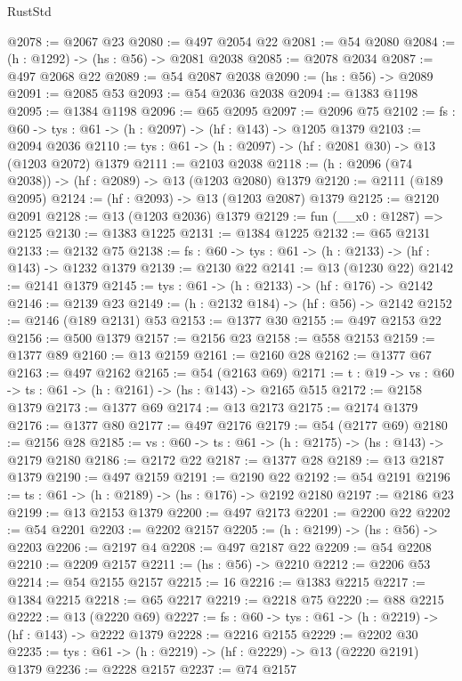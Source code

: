 \begin{lexlean}{RustStd}
\begin{coremodule}
{\begin{coremodule}
{{{{{{{{{{{{@2078 := @2067 @23
@2080 := @497 @2054 @22
@2081 := @54 @2080
@2084 := (h : @1292) -> (hs : @56) -> @2081 @2038
@2085 := @2078 @2034
@2087 := @497 @2068 @22
@2089 := @54 @2087 @2038
@2090 := (hs : @56) -> @2089
@2091 := @2085 @53
@2093 := @54 @2036 @2038
@2094 := @1383 @1198
@2095 := @1384 @1198
@2096 := @65 @2095
@2097 := @2096 @75
@2102 := {fs : @60} -> {tys : @61} -> (h : @2097) -> (hf : @143) -> @1205 @1379
@2103 := @2094 @2036
@2110 := {tys : @61} -> (h : @2097) -> (hf : @2081 @30) -> @13 (@1203 @2072) @1379
@2111 := @2103 @2038
@2118 := (h : @2096 (@74 @2038)) -> (hf : @2089) -> @13 (@1203 @2080) @1379
@2120 := @2111 (@189 @2095)
@2124 := (hf : @2093) -> @13 (@1203 @2087) @1379
@2125 := @2120 @2091
@2128 := @13 (@1203 @2036) @1379
@2129 := fun (__x0 : @1287) => @2125
@2130 := @1383 @1225
@2131 := @1384 @1225
@2132 := @65 @2131
@2133 := @2132 @75
@2138 := {fs : @60} -> {tys : @61} -> (h : @2133) -> (hf : @143) -> @1232 @1379
@2139 := @2130 @22
@2141 := @13 (@1230 @22)
@2142 := @2141 @1379
@2145 := {tys : @61} -> (h : @2133) -> (hf : @176) -> @2142
@2146 := @2139 @23
@2149 := (h : @2132 @184) -> (hf : @56) -> @2142
@2152 := @2146 (@189 @2131) @53
@2153 := @1377 @30
@2155 := @497 @2153 @22
@2156 := @500 @1379
@2157 := @2156 @23
@2158 := @558 @2153
@2159 := @1377 @89
@2160 := @13 @2159
@2161 := @2160 @28
@2162 := @1377 @67
@2163 := @497 @2162
@2165 := @54 (@2163 @69)
@2171 := {t : @19} -> {vs : @60} -> {ts : @61} -> (h : @2161) -> (hs : @143) -> @2165 @515
@2172 := @2158 @1379
@2173 := @1377 @69
@2174 := @13 @2173
@2175 := @2174 @1379
@2176 := @1377 @80
@2177 := @497 @2176
@2179 := @54 (@2177 @69)
@2180 := @2156 @28
@2185 := {vs : @60} -> {ts : @61} -> (h : @2175) -> (hs : @143) -> @2179 @2180
@2186 := @2172 @22
@2187 := @1377 @28
@2189 := @13 @2187 @1379
@2190 := @497 @2159
@2191 := @2190 @22
@2192 := @54 @2191
@2196 := {ts : @61} -> (h : @2189) -> (hs : @176) -> @2192 @2180
@2197 := @2186 @23
@2199 := @13 @2153 @1379
@2200 := @497 @2173
@2201 := @2200 @22
@2202 := @54 @2201
@2203 := @2202 @2157
@2205 := (h : @2199) -> (hs : @56) -> @2203
@2206 := @2197 @4
@2208 := @497 @2187 @22
@2209 := @54 @2208
@2210 := @2209 @2157
@2211 := (hs : @56) -> @2210
@2212 := @2206 @53
@2214 := @54 @2155 @2157
@2215 := 16
@2216 := @1383 @2215
@2217 := @1384 @2215
@2218 := @65 @2217
@2219 := @2218 @75
@2220 := @88 @2215
@2222 := @13 (@2220 @69)
@2227 := {fs : @60} -> {tys : @61} -> (h : @2219) -> (hf : @143) -> @2222 @1379
@2228 := @2216 @2155
@2229 := @2202 @30
@2235 := {tys : @61} -> (h : @2219) -> (hf : @2229) -> @13 (@2220 @2191) @1379
@2236 := @2228 @2157
@2237 := @74 @2157
}}}}}}}}}}}}
\end{coremodule}}
\end{coremodule}
\end{lexlean}
